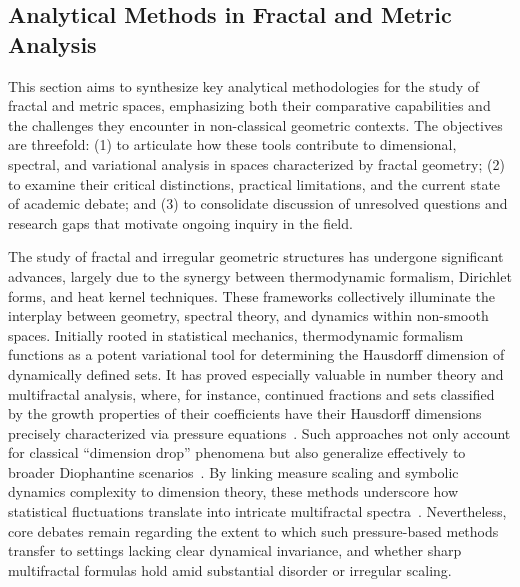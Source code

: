 \documentclass[sigconf]{acmart}
\begin{document}
\subsection{Analytical Methods in Fractal and Metric Analysis}

This section aims to synthesize key analytical methodologies for the study of fractal and metric spaces, emphasizing both their comparative capabilities and the challenges they encounter in non-classical geometric contexts. The objectives are threefold: (1) to articulate how these tools contribute to dimensional, spectral, and variational analysis in spaces characterized by fractal geometry; (2) to examine their critical distinctions, practical limitations, and the current state of academic debate; and (3) to consolidate discussion of unresolved questions and research gaps that motivate ongoing inquiry in the field.

The study of fractal and irregular geometric structures has undergone significant advances, largely due to the synergy between thermodynamic formalism, Dirichlet forms, and heat kernel techniques. These frameworks collectively illuminate the interplay between geometry, spectral theory, and dynamics within non-smooth spaces. Initially rooted in statistical mechanics, thermodynamic formalism functions as a potent variational tool for determining the Hausdorff dimension of dynamically defined sets. It has proved especially valuable in number theory and multifractal analysis, where, for instance, continued fractions and sets classified by the growth properties of their coefficients have their Hausdorff dimensions precisely characterized via pressure equations~\cite{ref38}. Such approaches not only account for classical ``dimension drop'' phenomena but also generalize effectively to broader Diophantine scenarios~\cite{ref13}. By linking measure scaling and symbolic dynamics complexity to dimension theory, these methods underscore how statistical fluctuations translate into intricate multifractal spectra~\cite{ref9}. Nevertheless, core debates remain regarding the extent to which such pressure-based methods transfer to settings lacking clear dynamical invariance, and whether sharp multifractal formulas hold amid substantial disorder or irregular scaling.
\end{document}
